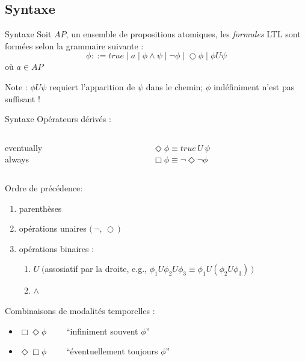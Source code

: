 \documentclass[compress]{beamer}
\begin{document}
\subsection{Syntaxe}
\begin{frame}
\begin{block}{Syntaxe}
Soit $AP$, un ensemble de propositions atomiques, les \textit{\color{fibeamer@orange}formules} LTL sont formées selon la {\color{fibeamer@orange}grammaire} suivante :
\[
  \phi ::= true \; | \; a \; | \; \phi \wedge \psi \; | \; \neg \phi \; | \; \bigcirc \phi \; | \; \phi U \psi
\]
où $a \in AP$
\end{block}
  \alert{Note : $\phi U \psi$ requiert l'apparition de $\psi$ dans le chemin; $\phi$ indéfiniment n'est pas suffisant !}

\end{frame}

\begin{frame}{Syntaxe}{}
\vspace{-0.05\linewidth}
{\color{fibeamer@orange}Opérateurs dérivés : \\ }
\vspace{-0.03\linewidth}
\begin{columns}
  \begin{column}{0.3\linewidth}
    eventually\\
    always \\
  \end{column}
  \begin{column}{0.3\linewidth}
    $ \Diamond \phi \equiv true\, U\, \psi$ \\
    $ \Box \phi \equiv \neg \Diamond \neg \phi $ \\
  \end{column}
\end{columns}
{\vspace{0.02\linewidth}\color{fibeamer@orange}Ordre de précédence: \\ }
\vspace{-0.05\linewidth}
\begin{enumerate}
  \item parenthèses
  \item opérations unaires $\big(\, \neg, \, \bigcirc\, \big)$
  \item opérations binaires :
    \begin{enumerate}
      \item $U \; \big($assosiatif par la droite,
      e.g., $\phi_1 U \phi_2 U \phi_3 \equiv \phi_1 U (\phi_2 U \phi_3) \, \big)$
      \item $\wedge$
    \end{enumerate}
\end{enumerate}
{\color{fibeamer@orange}Combinaisons de modalités temporelles :}
\begin{itemize}
  \item $\Box\Diamond \phi \quad \quad $ ``infiniment souvent $\phi$''
  \item $\Diamond\Box \phi \quad \quad $ ``éventuellement toujours $\phi$''
\end{itemize}
\end{frame}
\end{document}
